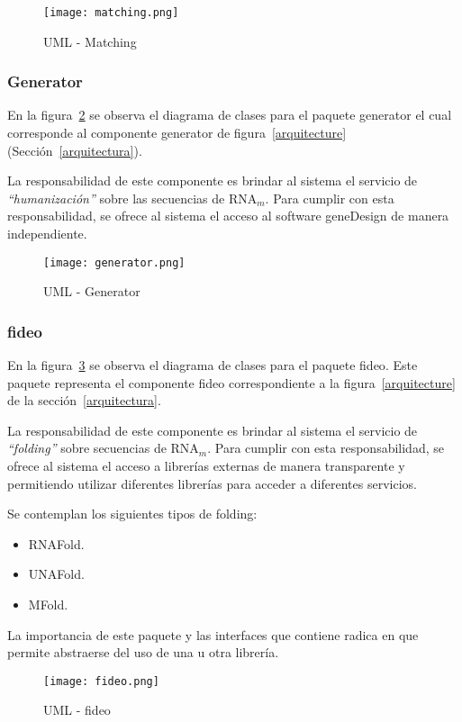\begin{figure}[!hbtp]
	\begin{center}
		\texttt{[image: matching.png]}
		\caption{UML - Matching}
		\label{matching}
	\end{center}
\end{figure}


\subsubsection{Generator}
\par En la figura~\ref{generadorPackage} se observa el diagrama de clases para el paquete \textsf{generator} el cual corresponde al componente \textsf{generator} de figura~\ref{arquitecture} (Sección~\ref{arquitectura}).

\par La responsabilidad de este componente es brindar al sistema el servicio de \emph{``humanización''} sobre las secuencias de RNA$_m$. Para cumplir con esta responsabilidad, se ofrece al sistema el acceso al software \textsf{geneDesign} de manera independiente. 

\begin{figure}[!hbtp]
	\begin{center}
		\texttt{[image: generator.png]}
		\caption{UML - Generator}
		\label{generadorPackage}
	\end{center}
\end{figure}

\subsubsection{fideo}
\par En la figura~\ref{fideopackage} se observa el diagrama de clases para el paquete \textsf{fideo}. Este paquete representa el componente \textsf{fideo} correspondiente a la figura~\ref{arquitecture} de la sección~\ref{arquitectura}.
\par La responsabilidad de este componente es brindar al sistema el servicio de \emph{``folding''} sobre secuencias de RNA$_m$. Para cumplir con esta responsabilidad, se ofrece al sistema el acceso a librerías externas de manera transparente y
permitiendo utilizar diferentes librerías para acceder a diferentes servicios. 
\par Se contemplan los siguientes tipos de folding:
\begin{itemize}
	\item RNAFold.
	\item UNAFold.
	\item MFold.
\end{itemize}
\par La importancia de este paquete y las interfaces que contiene radica en que permite abstraerse del uso de una u otra librería.

\begin{figure}[!hbtp]
	\begin{center}
		\texttt{[image: fideo.png]}
		\caption{UML - fideo}
		\label{fideopackage}
	\end{center}
\end{figure}
